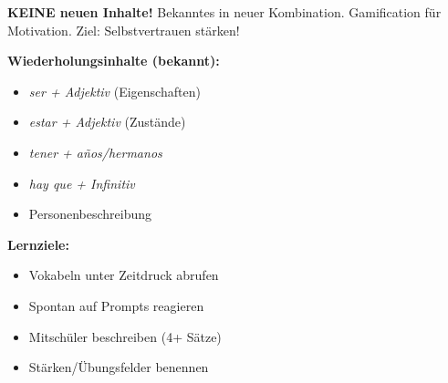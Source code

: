 \documentclass[11pt, a4paper]{article}
\begin{document}


\vspace{1.2cm}


\begin{tcolorbox}[
    colback=wichtig!15,
    colframe=wichtig,
    boxrule=1.5pt,
    top=4pt, bottom=4pt, left=6pt, right=6pt
]
\textbf{KEINE neuen Inhalte!} Bekanntes in neuer Kombination. Gamification für Motivation. Ziel: Selbstvertrauen stärken!
\end{tcolorbox}

\vspace{0.2cm}


\begin{minipage}[t]{0.48\textwidth}
\textbf{Wiederholungsinhalte (bekannt):}
\begin{itemize}
\item \textit{ser + Adjektiv} (Eigenschaften)
\item \textit{estar + Adjektiv} (Zustände)
\item \textit{tener + años/hermanos}
\item \textit{hay que + Infinitiv}
\item Personenbeschreibung
\end{itemize}
\end{minipage}
\hfill
\begin{minipage}[t]{0.48\textwidth}
\textbf{Lernziele:}
\begin{itemize}
\item Vokabeln unter Zeitdruck abrufen
\item Spontan auf Prompts reagieren
\item Mitschüler beschreiben (4+ Sätze)
\item Stärken/Übungsfelder benennen
\end{itemize}
\end{minipage}
\end{document}
